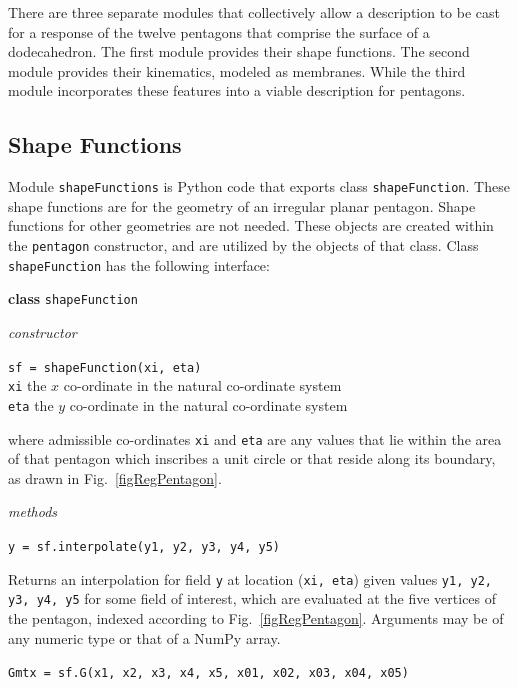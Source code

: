 \label{appPentagons}

There are three separate modules that collectively allow a description to be cast for a response of the twelve pentagons that comprise the surface of a dodecahedron.  The first module provides their shape functions.  The second module provides their kinematics, modeled as membranes.  While the third module incorporates these features into a viable description for pentagons.

\subsection{Shape Functions}
\label{appShapeFunctions}

Module \texttt{shapeFunctions} is Python code that exports class \texttt{shapeFunction}.  These shape functions are for the geometry of an irregular planar pentagon.  Shape functions for other geometries are not needed.  These objects are created within the \texttt{pentagon} constructor, and are utilized by the objects of that class.  Class \texttt{shapeFunction} has the following interface:

\medskip\noindent
\textbf{class} \texttt{shapeFunction}

\medskip\noindent
\textit{constructor}

\medskip\noindent
\texttt{sf = shapeFunction(xi, eta)} \\
\indent \texttt{xi} \;\;\;\: the $x$ co-ordinate in the natural co-ordinate system \\
\indent \texttt{eta} \;\;  the $y$ co-ordinate in the natural co-ordinate system

\medskip\noindent
where admissible co-ordinates \texttt{xi} and \texttt{eta} are any values that lie within the area of that pentagon which inscribes a unit circle or that reside along its boundary, as drawn in Fig.~\ref{figRegPentagon}.

\medskip\noindent
\textit{methods}

\medskip\noindent
\texttt{y = sf.interpolate(y1, y2, y3, y4, y5)}

\medskip\noindent
Returns an interpolation for field \texttt{y} at location (\texttt{xi, eta}) given values \texttt{y1, y2, y3, y4, y5} for some field of interest, which are evaluated at the five vertices of the pentagon, indexed according to Fig.~\ref{figRegPentagon}.  Arguments may be of any numeric type or that of a NumPy array.

\medskip\noindent
\texttt{Gmtx = sf.G(x1, x2, x3, x4, x5, x01, x02, x03, x04, x05)}

